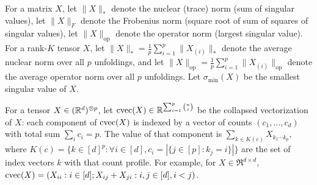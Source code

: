 For a matrix $X$,
let $\|X\|_*$ denote the nuclear (trace) norm (sum of singular values),
let $\|X\|_F$ denote the Frobenius norm (square root of sum of squares of singular values),
let $\|X\|_\text{op}$ denote the operator norm (largest singular value).
For a rank-$K$ tensor $X$,
let $\|X\|_* = \frac{1}{p} \sum_{i=1}^p \|X_{(i)}\|_*$ denote
the average nuclear norm over all $p$ unfoldings,
and let $\|X\|_\text{op} = \frac{1}{p} \sum_{i=1}^p \|X_{(i)}\|_\text{op}$
denote the average operator norm over all $p$ unfoldings.
Let $\sigma_\text{min}(X)$ be the smallest singular value of $X$.

For a tensor $X \in (\mathbb{R}^d)^{\otimes p}$,
let $\operatorname{cvec}(X) \in \mathbb{R}^{\sum_{i=1}^p \binom{n}{i}}$ be
the collapsed vectorization of $X$: each component of $\operatorname{cvec}(X)$
is indexed by a vector of counts $(c_1, \dots, c_d)$ with total sum $\sum_i c_i = p$.
The value of that component is
$\sum_{k \in K(c)} X_{k_1 \cdots k_p}$,
where $K(c) = \{ k \in [d]^p : \forall i \in [d], c_i = |\{ j \in [p] : k_j = i \}| \}$ are the set of index vectors $k$ with that count profile.
For example, for $X \in \Re^{d \times d}$,
$\operatorname{cvec}(X) = (X_{ii} : i \in [d]; X_{ij} + X_{ji} : i,j \in [d], i<j)$.
